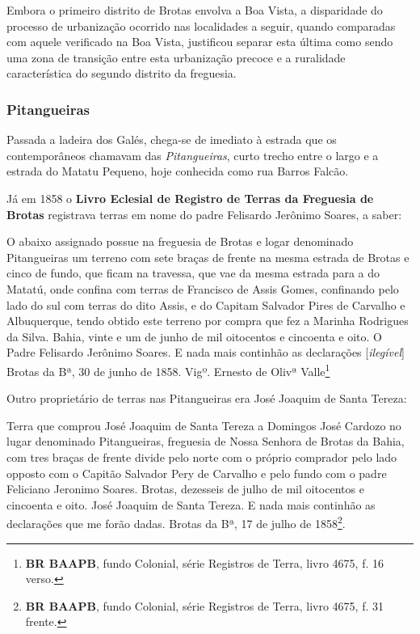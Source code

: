 Embora o primeiro distrito de Brotas envolva a Boa Vista, a disparidade do processo de urbanização ocorrido nas localidades a seguir, quando comparadas com aquele verificado na Boa Vista, justificou separar esta última como sendo uma zona de transição entre esta urbanização precoce e a ruralidade característica do segundo distrito da freguesia.

\subsubsection{Pitangueiras}\label{subsubsec:pitangueiras}

Passada a ladeira dos Galés, chega-se de imediato à estrada que os contemporâneos chamavam das \textit{Pitangueiras}, curto trecho entre o largo e a estrada do Matatu Pequeno, hoje conhecida como rua Barros Falcão. 

Já em 1858 o \textbf{Livro Eclesial de Registro de Terras da Freguesia de Brotas} registrava terras em nome do padre Felisardo Jerônimo Soares, a saber:

\begin{citacao}
O abaixo assignado possue na freguesia de Brotas e logar denominado Pitangueiras um terreno com sete braças de frente na mesma estrada de Brotas e cinco de fundo, que ficam na travessa, que vae da mesma estrada para a do Matatú, onde confina com terras de Francisco de Assis Gomes, confinando pelo lado do sul com terras do dito Assis, e do Capitam Salvador Pires de Carvalho e Albuquerque, tendo obtido este terreno por compra que fez a Marinha Rodrigues da Silva. Bahia, vinte e um de junho de mil oitocentos e cincoenta e oito. O Padre Felisardo Jerônimo Soares. E nada mais continhão as declarações [\textit{ilegível}] Brotas da Bª, 30 de junho de 1858. 
Vigº. Ernesto de Olivª Valle\footnote{\textbf{BR BAAPB}, fundo Colonial, série Registros de Terra, livro 4675, f. 16 verso.}
\end{citacao}

Outro proprietário de terras nas Pitangueiras era José Joaquim de Santa Tereza:

\begin{citacao}
Terra que comprou José Joaquim de Santa Tereza a Domingos José Cardozo no lugar denominado Pitangueiras, freguesia de Nossa Senhora de Brotas da Bahia, com tres braças de frente divide pelo norte com o próprio comprador pelo lado opposto com o Capitão Salvador Pery de Carvalho e pelo fundo com o padre Feliciano Jeronimo Soares. Brotas, dezesseis de julho de mil oitocentos e cincoenta e oito. José Joaquim de Santa Tereza. E nada mais continhão as declarações que me forão dadas. Brotas da Bª, 17 de julho de 1858\footnote{\textbf{BR BAAPB}, fundo Colonial, série Registros de Terra, livro 4675, f. 31 frente.}.
\end{citacao}


